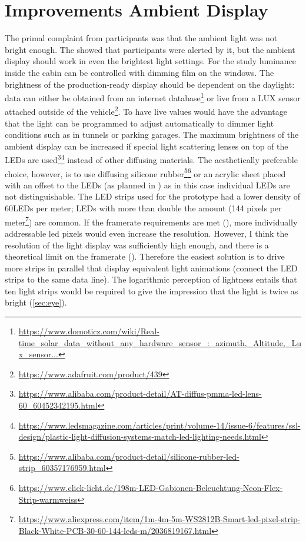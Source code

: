 \section{Improvements Ambient Display}
\label{ImrpoveDisplay}
The primal complaint from participants was that the ambient light was not bright enough. The  showed that participants were alerted by it, but the ambient display should work in even the brightest light settings. For the study luminance inside the cabin can be controlled with dimming film on the windows. The brightness of the production-ready display should be dependent on the daylight: data can either be obtained from an internet database\footnote{\url{https://www.domoticz.com/wiki/Real-time_solar_data_without_any_hardware_sensor_:_azimuth,_Altitude,_Lux_sensor...}} or live from a LUX sensor attached outside of the vehicle\footnote{\url{https://www.adafruit.com/product/439}}. To have live values would have the advantage that the light can be programmed to adjust automatically to dimmer light conditions such as in tunnels or parking garages. The maximum brightness of the ambient display can be increased if special light scattering lenses on top of the LEDs are used\footnote{\url{https://www.alibaba.com/product-detail/AT-diffus-pmma-led-lens-60_60452342195.html}}\fnsep\footnote{\url{https://www.ledsmagazine.com/articles/print/volume-14/issue-6/features/ssl-design/plastic-light-diffusion-systems-match-led-lighting-needs.html}} instead of other diffusing materials. The aesthetically preferable choice, however, is to use diffusing silicone rubber\footnote{\url{https://www.alibaba.com/product-detail/silicone-rubber-led-strip_60357176959.html}}\fnsep\footnote{\url{https://www.click-licht.de/198m-LED-Gabionen-Beleuchtung-Neon-Flex-Strip-warmweiss}} or an acrylic sheet placed with an offset to the LEDs (as planned in ) as in this case individual LEDs are not distinguishable. The LED strips used for the prototype had a lower density of 60LEDs per meter; LEDs with more than double the amount (144 pixels per meter\footnote{\url{https://www.aliexpress.com/item/1m-4m-5m-WS2812B-Smart-led-pixel-strip-Black-White-PCB-30-60-144-leds-m/2036819167.html}}) are common. If the framerate requirements are met (), more individually addressable led pixels would even increase the resolution. However, I think the resolution of the light display was sufficiently high enough, and there is a theoretical limit on the framerate (). Therefore the easiest solution is to drive more strips in parallel that display equivalent light animations (connect the LED strips to the same data line). The logarithmic perception of lightness entails that ten light strips would be required to give the impression that the light is twice as bright (\ref{sec:eye}). %

